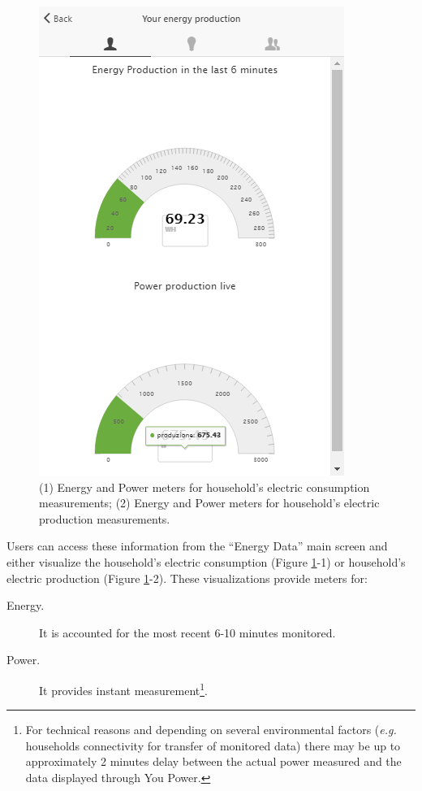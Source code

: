 \begin{figure}
\begin{center}
\begin{minipage}[htb]{0.45\linewidth}
         \includegraphics[width=1\linewidth]{img/visual_production.png}  
        \end{minipage}
      \end{center}
    \caption{(1) Energy and Power meters for household's electric consumption measurements; (2) Energy and Power meters for household's electric production measurements.
}
\label{fig:viz_rt}
\end{figure}

Users can access these information from the ``Energy Data'' main screen and either visualize the household's electric consumption (Figure \ref{fig:viz_rt}-1) or
household's electric production (Figure \ref{fig:viz_rt}-2).
These visualizations provide meters for:
\begin{description}
 \item[Energy.] It is accounted for the most recent 6-10 minutes monitored.
 \item[Power.] It provides instant measurement\footnote{For technical reasons and depending on several environmental factors (\textit{e.g.} households connectivity for transfer of monitored data) there may be up to approximately 2 minutes delay between the actual power measured and the data displayed through You Power.}.
\end{description}



